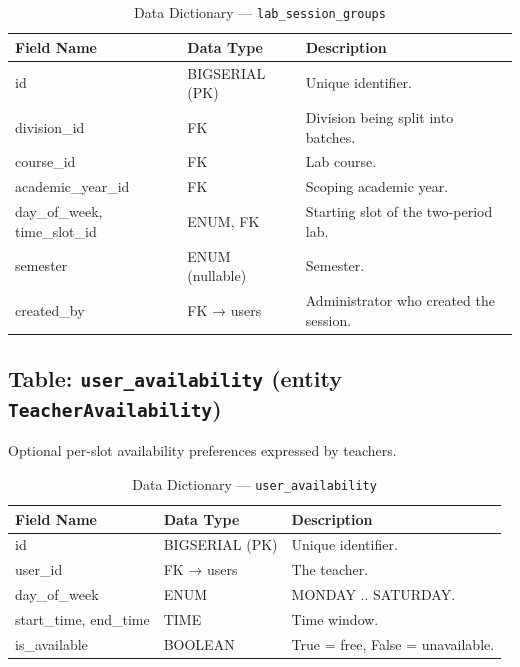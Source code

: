 \begin{table}[H]
    \centering
    \renewcommand{\arraystretch}{1.5}
    \begin{tabular}{|p{3.5cm}|p{2.5cm}|p{7.5cm}|}
        \hline
        \textbf{Field Name} & \textbf{Data Type} & \textbf{Description} \\
        \hline
        id & BIGSERIAL (PK) & Unique identifier. \\
        \hline
        division\_id & FK & Division being split into batches. \\
        \hline
        course\_id & FK & Lab course. \\
        \hline
        academic\_year\_id & FK & Scoping academic year. \\
        \hline
        day\_of\_week, time\_slot\_id & ENUM, FK & Starting slot of the two-period lab. \\
        \hline
        semester & ENUM (nullable) & Semester. \\
        \hline
        created\_by & FK → users & Administrator who created the session. \\
        \hline
    \end{tabular}
    \caption{Data Dictionary --- \texttt{lab\_session\_groups}}
    \label{tab:dd_lab_groups}
\end{table}

\subsection{Table: \texttt{user\_availability} (entity \texttt{TeacherAvailability})}
Optional per-slot availability preferences expressed by teachers.

\begin{table}[H]
    \centering
    \renewcommand{\arraystretch}{1.5}
    \begin{tabular}{|p{3.5cm}|p{2.5cm}|p{7.5cm}|}
        \hline
        \textbf{Field Name} & \textbf{Data Type} & \textbf{Description} \\
        \hline
        id & BIGSERIAL (PK) & Unique identifier. \\
        \hline
        user\_id & FK → users & The teacher. \\
        \hline
        day\_of\_week & ENUM & MONDAY .. SATURDAY. \\
        \hline
        start\_time, end\_time & TIME & Time window. \\
        \hline
        is\_available & BOOLEAN & True = free, False = unavailable. \\
        \hline
    \end{tabular}
    \caption{Data Dictionary --- \texttt{user\_availability}}
    \label{tab:dd_availability}
\end{table}

